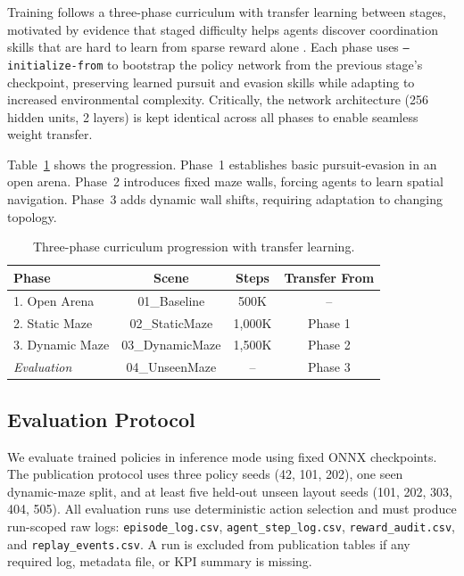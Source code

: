 \documentclass[conference]{IEEEtran}
\begin{document}
Training follows a three-phase curriculum with transfer learning between stages, motivated by evidence that staged difficulty helps agents discover coordination skills that are hard to learn from sparse reward alone \cite{zhang2023curriculum}. Each phase uses \texttt{--initialize-from} to bootstrap the policy network from the previous stage's checkpoint, preserving learned pursuit and evasion skills while adapting to increased environmental complexity. Critically, the network architecture (256 hidden units, 2 layers) is kept identical across all phases to enable seamless weight transfer.

Table~\ref{tab:curriculum} shows the progression. Phase~1 establishes basic pursuit-evasion in an open arena. Phase~2 introduces fixed maze walls, forcing agents to learn spatial navigation. Phase~3 adds dynamic wall shifts, requiring adaptation to changing topology.

\begin{table}[t]
\centering
\caption{Three-phase curriculum progression with transfer learning.}
\label{tab:curriculum}
\begin{tabular}{lccc}
\toprule
Phase & Scene & Steps & Transfer From \\
\midrule
1. Open Arena & 01\_Baseline & 500K & -- \\
2. Static Maze & 02\_StaticMaze & 1{,}000K & Phase 1 \\
3. Dynamic Maze & 03\_DynamicMaze & 1{,}500K & Phase 2 \\
\midrule
\textit{Evaluation} & 04\_UnseenMaze & -- & Phase 3 \\
\bottomrule
\end{tabular}
\end{table}

\subsection{Evaluation Protocol}

We evaluate trained policies in inference mode using fixed ONNX checkpoints. The publication protocol uses three policy seeds (42, 101, 202), one seen dynamic-maze split, and at least five held-out unseen layout seeds (101, 202, 303, 404, 505). All evaluation runs use deterministic action selection and must produce run-scoped raw logs: \texttt{episode\_log.csv}, \texttt{agent\_step\_log.csv}, \texttt{reward\_audit.csv}, and \texttt{replay\_events.csv}. A run is excluded from publication tables if any required log, metadata file, or KPI summary is missing.
\end{document}
